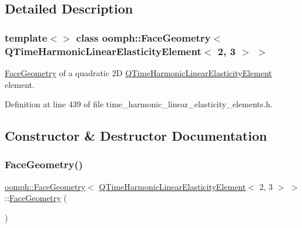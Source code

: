 \subsection{Detailed Description}
\subsubsection*{template$<$$>$\newline
class oomph\+::\+Face\+Geometry$<$ Q\+Time\+Harmonic\+Linear\+Elasticity\+Element$<$ 2, 3 $>$ $>$}

\hyperlink{classoomph_1_1FaceGeometry}{Face\+Geometry} of a quadratic 2D \hyperlink{classoomph_1_1QTimeHarmonicLinearElasticityElement}{Q\+Time\+Harmonic\+Linear\+Elasticity\+Element} element. 

Definition at line 439 of file time\+\_\+harmonic\+\_\+linear\+\_\+elasticity\+\_\+elements.\+h.



\subsection{Constructor \& Destructor Documentation}
\mbox{\label{classoomph_1_1FaceGeometry_3_01QTimeHarmonicLinearElasticityElement_3_012_00_013_01_4_01_4_a105956d2938e63d81aaca232b12aede6}} 
\subsubsection{\texorpdfstring{Face\+Geometry()}{FaceGeometry()}}
{\footnotesize\ttfamily \hyperlink{classoomph_1_1FaceGeometry}{oomph\+::\+Face\+Geometry}$<$ \hyperlink{classoomph_1_1QTimeHarmonicLinearElasticityElement}{Q\+Time\+Harmonic\+Linear\+Elasticity\+Element}$<$ 2, 3 $>$ $>$\+::\hyperlink{classoomph_1_1FaceGeometry}{Face\+Geometry} (\begin{DoxyParamCaption}{ }\end{DoxyParamCaption})\hspace{0.3cm}{\ttfamily [inline]}}



